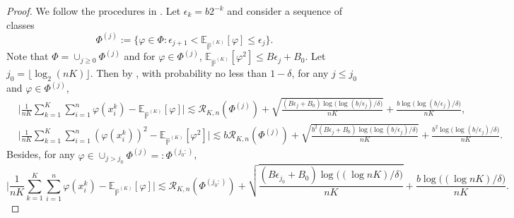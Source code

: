 \documentclass{article}
\numberwithin{equation}{section}
\newcommand{\E}{\mathbb{E}}
\theoremstyle{definition}
\renewcommand{\P}{\mathbb{P}}
\begin{document}
\begin{proof}
    We follow the procedures in \citet{bousquet2002concentration}.
    Let $\epsilon_k=b2^{-k}$ and consider a sequence of classes
    \begin{equation}
        \Phi^{(j)}:=\{\varphi\in\Phi: \epsilon_{j+1}<\E_{\widehat{\P}^{(K)}}[\varphi] \leq \epsilon_j\}.
    \end{equation}
    Note that $\Phi=\cup_{j\geq 0}\Phi^{(j)}$ and for $\varphi\in\Phi^{(j)}$, $\E_{\widehat{\P}^{(K)}}[\varphi^2]\leq B\epsilon_j+B_0$.
    Let $j_0=\lfloor\log_2(nK)\rfloor$.
    Then by \citet[Theorem 3]{massart2000constants}, with probability no less than $1-\delta$, for any $j\leq j_0$ and $\varphi\in\Phi^{(j)}$,
    \begin{align}
        &\Big|\frac{1}{nK}\sum_{k=1}^K\sum_{i=1}^n\varphi(x_i^k)-\E_{\widehat{\P}^{(K)}}[\varphi]\Big|\lesssim \mathcal{R}_{K,n}(\Phi^{(j)})+\sqrt{\frac{(B\epsilon_j+B_0)\log\big(\log(b/\epsilon_j)/\delta\big)}{nK}} + \frac{b\log\big(\log(b/\epsilon_j)/\delta\big)}{nK}, \label{eq:rademacher_meta_1}\\
        &\Big|\frac{1}{nK}\sum_{k=1}^K\sum_{i=1}^n(\varphi(x_i^k))^2-\E_{\widehat{\P}^{(K)}}[\varphi^2]\Big|\lesssim b\mathcal{R}_{K,n}(\Phi^{(j)})+\sqrt{\frac{b^2(B\epsilon_j+B_0)\log\big(\log(b/\epsilon_j)/\delta\big)}{nK}} + \frac{b^2\log\big(\log(b/\epsilon_j)/\delta\big)}{nK}. \label{eq:rademacher_meta_2}
    \end{align}
    Besides, for any $\varphi\in\cup_{j>j_0}\Phi^{(j)}=:\Phi^{(j_0:)}$,
    \begin{equation}\label{eq:rademacher_meta_3}
        \Big|\frac{1}{nK}\sum_{k=1}^K\sum_{i=1}^n\varphi(x_i^k)-\E_{\widehat{\P}^{(K)}}[\varphi]\Big|\lesssim \mathcal{R}_{K,n}(\Phi^{(j_0:)})+\sqrt{\frac{(B\epsilon_{j_0}+B_0)\log\big((\log nK)/\delta\big)}{nK}} + \frac{b\log\big( (\log nK)/\delta\big)}{nK}.
    \end{equation}
    

\end{proof}
\end{document}
